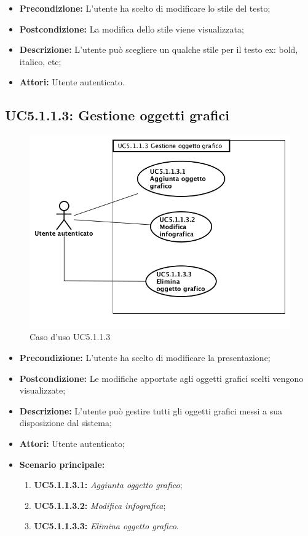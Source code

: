 \begin{itemize}
	\item \textbf{Precondizione:} L'utente ha scelto di modificare lo stile del testo;
	\item \textbf{Postcondizione:} La modifica dello stile viene visualizzata;
	\item \textbf{Descrizione:} L'utente può scegliere un qualche stile per il testo ex: bold, italico, etc;
	\item \textbf{Attori:} Utente autenticato.
\end{itemize}
\newpage
\subsection{ UC5.1.1.3: Gestione oggetti grafici}

\begin{figure}[h]
	\begin{center}
	\includegraphics[scale=0.4]{diagram/UC5-1-1-3.png}
	\caption{Caso d'uso UC5.1.1.3}
	\end{center}
\end{figure}
\begin{itemize}
	\item \textbf{Precondizione:} L'utente ha scelto di modificare la presentazione;
	\item \textbf{Postcondizione:} Le modifiche apportate agli oggetti grafici scelti vengono visualizzate;
	\item \textbf{Descrizione:} L'utente può gestire tutti gli oggetti grafici messi a sua disposizione dal sistema;
	\item \textbf{Attori:} Utente autenticato;
	\item \textbf{Scenario principale:}
	\begin{enumerate}
		\item \textbf{ UC5.1.1.3.1:} \textit{ Aggiunta oggetto grafico};
		\item \textbf{ UC5.1.1.3.2:} \textit{ Modifica infografica};
		\item \textbf{ UC5.1.1.3.3:} \textit{ Elimina oggetto grafico}.
	\end{enumerate}
\end{itemize}

